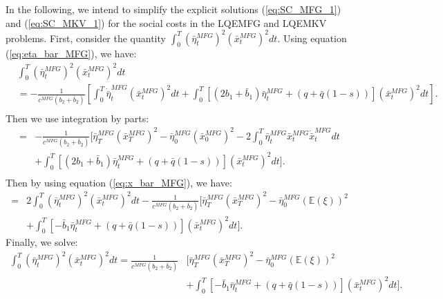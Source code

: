 \documentclass[11pt]{article}
\begin{document}
In the following, we intend to simplify the explicit solutions (\ref{eq:SC_MFG_1}) and (\ref{eq:SC_MKV_1}) for the social costs in the LQEMFG and LQEMKV problems. First, consider the quantity $\int_0^T (\bar{\eta}^{MFG}_t)^2 (\bar{x}^{MFG}_t)^2 dt$. Using equation (\ref{eq:eta_bar_MFG}), we have:
\begin{equation*}
\begin{split}
&\int_0^T (\bar{\eta}^{MFG}_t)^2 (\bar{x}^{MFG}_t)^2 dt\\
&= - \frac{1}{c^{MFG}(b_2 + \bar{b}_2)} \left[ \int_0^T \dot{\bar{\eta}}^{MFG}_t (\bar{x}^{MFG}_t)^2 dt +  \int_0^T \left[(2b_1 + \bar{b}_1) \bar{\eta}^{MFG}_t +(q+\bar{q}(1-s))\right] (\bar{x}^{MFG}_t)^2 dt \right].\\
\end{split}
\end{equation*}
Then we use integration by parts:
\begin{equation*}
\begin{split}
= & - \frac{1}{c^{MFG}(b_2 + \bar{b}_2)} \Bigg[ \bar{\eta}^{MFG}_T(\bar{x}^{MFG}_T)^2-\bar{\eta}^{MFG}_0(\bar{x}^{MFG}_0)^2-2\int_0^T\bar{\eta}^{MFG}_t\bar{x}^{MFG}_t\dot{\bar{x}}^{MFG}_t dt \\
& + \int_0^T \left[(2b_1 + \bar{b}_1) \bar{\eta}^{MFG}_t +(q+\bar{q}(1-s))\right] (\bar{x}^{MFG}_t)^2 dt \Bigg]. \\
\end{split}
\end{equation*}
Then by using equation (\ref{eq:x_bar_MFG}), we have:
\begin{equation*}
\begin{split}
= & 2 \int_0^T (\bar{\eta}^{MFG}_t)^2 (\bar{x}^{MFG}_t)^2dt  - \frac{1}{c^{MFG}(b_2 + \bar{b}_2)} \Bigg[ \bar{\eta}^{MFG}_T (\bar{x}^{MFG}_T)^2 - \bar{\eta}^{MFG}_0 (\mathbb{E}(\xi))^2 \\
&+ \int_0^T  \left[-\bar{b}_1 \bar{\eta}^{MFG}_t +(q+\bar{q}(1-s))\right] (\bar{x}^{MFG}_t)^2 dt \Bigg].
\end{split}
\end{equation*}
Finally, we solve:
\begin{equation*}
\begin{split}
\int_0^T (\bar{\eta}^{MFG}_t)^2 (\bar{x}^{MFG}_t)^2 dt= \frac{1}{c^{MFG}(b_2 + \bar{b}_2)} &\Bigg[ \bar{\eta}^{MFG}_T (\bar{x}^{MFG}_T)^2 - \bar{\eta}^{MFG}_0 (\mathbb{E}(\xi))^2 \\
&+ \int_0^T  \left[-\bar{b}_1 \bar{\eta}^{MFG}_t+(q+\bar{q}(1-s))\right] (\bar{x}^{MFG}_t)^2 dt \Bigg].
\end{split}
\end{equation*}
\end{document}
